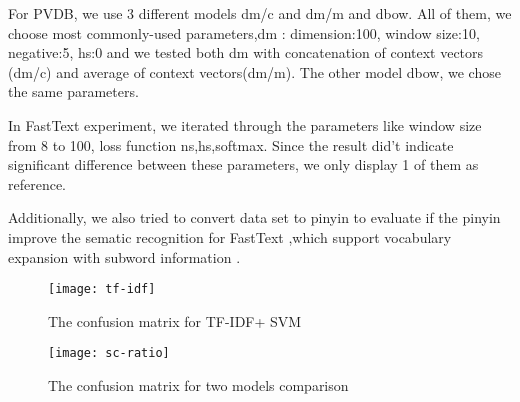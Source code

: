 For PVDB, we use 3 different models dm/c and dm/m and dbow. All of them, we choose most commonly-used parameters,dm : dimension:100, window size:10, negative:5, hs:0 and we tested both dm with concatenation of context vectors (dm/c) and average of context vectors(dm/m). The other model dbow, we chose the same parameters.

In FastText experiment, we iterated through the parameters like window size from 8 to 100, loss function ns,hs,softmax.  Since the result did't indicate significant difference between these parameters, we only display 1 of them as reference.

Additionally, we also tried to convert data set to pinyin to evaluate if the pinyin improve the sematic recognition for FastText ,which support vocabulary expansion with subword information \cite{bojanowski2016enriching}. 

\begin{figure}[h]
    \centering
	\texttt{[image: tf-idf]}
    \caption{The confusion matrix for TF-IDF+ SVM}
    \label{fig:sub1}
\end{figure}

\begin{figure}[h]
    \centering
	\texttt{[image: sc-ratio]}
    \caption{The confusion matrix for two models comparison}
    \label{fig:sub2}
\end{figure}